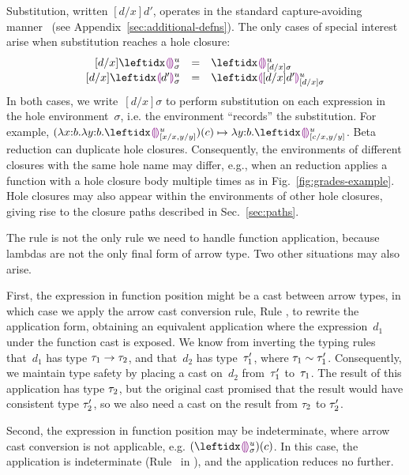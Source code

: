 


Substitution, written $[d/x]d'$, operates in the standard capture-avoiding manner~\cite{pfpl} (see Appendix~\ref{sec:additional-defns}).
%
The only cases of special interest arise when substitution reaches a hole closure:
\[
\begin{array}{rcl}
  [d/x]\dehole{u}{\sigma}{} & = & \dehole{u}{[d/x]\sigma}{} \\%
  \substitute{d}{x}{\dhole{d'}{u}{\sigma}{}} & = & \dhole{[d/x]d'}{u}{[d/x]\sigma}{}
\end{array}
\]
In both cases, we write~$[d/x]\sigma$ to perform substitution on each expression in the hole environment~$\sigma$, i.e. the environment ``records'' the substitution.
%
For example, $\stepsToD{}
    {\hap{(\halam{x}{b}{\halam{y}{b}{\dehole{u}{[x/x, y/y]}{}}})}{c}}
    {\halam{y}{b}{\dehole{u}{[c/x, y/y]}{}}}$.
%
Beta reduction can duplicate hole closures.
%
Consequently, the environments of different closures with the same hole name may differ,
e.g., when an reduction applies a function with a hole closure body multiple times as in Fig.~\ref{fig:grades-example}.
Hole closures may also appear within the environments of other hole
closures, giving rise to the closure paths described in
Sec.~\ref{sec:paths}.



The  rule is not the only rule we need to handle function
application, because lambdas are not the only final form of arrow type.
%
Two other situations may also arise.

First, the expression in function position might be a cast between
arrow types, in which case we apply the arrow cast conversion rule,
Rule , to rewrite the application form, obtaining an
equivalent application where the expression~$d_1$ under the function
cast is exposed.
%
We know from inverting the typing rules that~$d_1$ has type
$\tau_1 \rightarrow \tau_2$, and that~$d_2$ has type~$\tau_1'$, where
$\tau_1 \sim \tau_1'$.
Consequently, we maintain type
safety by placing a cast on~$d_2$ from~$\tau_1'$ to~$\tau_1$.
%
The result of this application has type $\tau_2$, but the
original cast promised that the result would have consistent type
$\tau_2'$, so we also need a cast on the result from $\tau_2$ to
$\tau_2'$.

Second, the expression in function position may be indeterminate,
where arrow cast conversion is not applicable,
e.g. $\hap{(\dehole{u}{\sigma}{})}{c}$.
%
In this case, the application is indeterminate (Rule~
in ), and the application reduces no
further.

